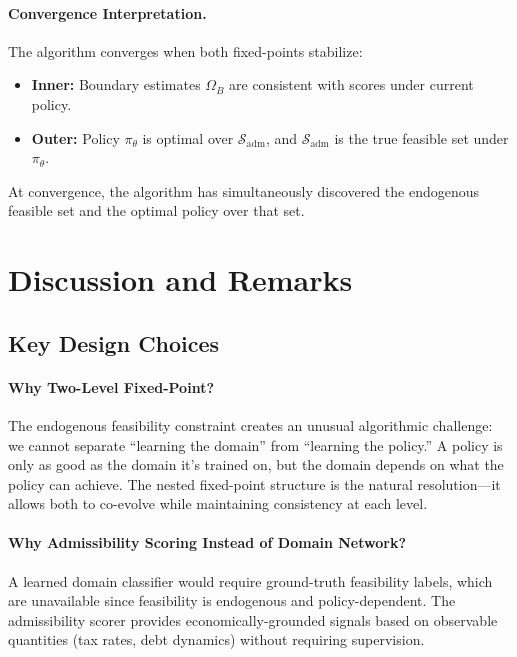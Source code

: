 \paragraph{Convergence Interpretation.}
The algorithm converges when both fixed-points stabilize:
\begin{itemize}
    \item \textbf{Inner:} Boundary estimates $\Omega_B$ are consistent with scores under current policy.
    \item \textbf{Outer:} Policy $\pi_\theta$ is optimal over $\mathcal{S}_{\text{adm}}$, and $\mathcal{S}_{\text{adm}}$ is the true feasible set under $\pi_\theta$.
\end{itemize}
At convergence, the algorithm has simultaneously discovered the endogenous feasible set and the optimal policy over that set.


\section{Discussion and Remarks}

\subsection{Key Design Choices}

\paragraph{Why Two-Level Fixed-Point?}
The endogenous feasibility constraint creates an unusual algorithmic challenge: we cannot separate ``learning the domain'' from ``learning the policy.'' A policy is only as good as the domain it's trained on, but the domain depends on what the policy can achieve. The nested fixed-point structure is the natural resolution---it allows both to co-evolve while maintaining consistency at each level.

\paragraph{Why Admissibility Scoring Instead of Domain Network?}
A learned domain classifier would require ground-truth feasibility labels, which are unavailable since feasibility is endogenous and policy-dependent. The admissibility scorer provides economically-grounded signals based on observable quantities (tax rates, debt dynamics) without requiring supervision.

